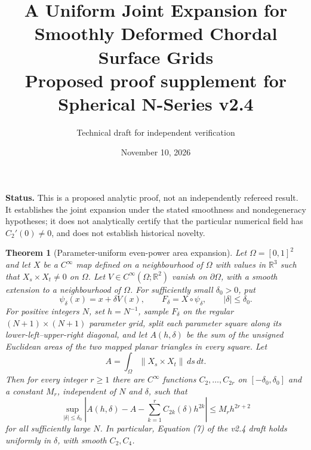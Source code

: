 \documentclass[11pt]{article}
\title{A Uniform Joint Expansion for Smoothly Deformed Chordal Surface Grids\\\large Proposed proof supplement for Spherical N-Series v2.4}
\author{Technical draft for independent verification}
\date{November 10, 2026}
\newtheorem{theorem}{Theorem}
\begin{document}
\maketitle
\noindent\textbf{Status.} This is a proposed analytic proof, not an independently refereed result. It establishes the joint expansion under the stated smoothness and nondegeneracy hypotheses; it does not analytically certify that the particular numerical field has $C_2'(0)\ne0$, and does not establish historical novelty.

\begin{theorem}[Parameter-uniform even-power area expansion]\label{thm:uniform}
Let $\Omega=[0,1]^2$ and let $X$ be a $C^\infty$ map defined on a neighbourhood of $\Omega$ with values in $\mathbb R^3$ such that $X_s\times X_t\ne0$ on $\Omega$. Let $V\in C^\infty(\Omega;\mathbb R^2)$ vanish on $\partial\Omega$, with a smooth extension to a neighbourhood of $\Omega$. For sufficiently small $\delta_0>0$, put
\[
\psi_\delta(x)=x+\delta V(x),\qquad F_\delta=X\circ\psi_\delta,\qquad |\delta|\le\delta_0.
\]
For positive integers $N$, set $h=N^{-1}$, sample $F_\delta$ on the regular $(N+1)\times(N+1)$ parameter grid, split each parameter square along its lower-left--upper-right diagonal, and let $A(h,\delta)$ be the sum of the unsigned Euclidean areas of the two mapped planar triangles in every square. Let
\[
A=\int_\Omega\|X_s\times X_t\|\,ds\,dt.
\]
Then for every integer $r\ge1$ there are $C^\infty$ functions $C_2,\ldots,C_{2r}$ on $[-\delta_0,\delta_0]$ and a constant $M_r$, independent of $N$ and $\delta$, such that
\[
\sup_{|\delta|\le\delta_0}\left|A(h,\delta)-A-\sum_{k=1}^{r}C_{2k}(\delta)h^{2k}\right|\le M_r h^{2r+2}
\]
for all sufficiently large $N$. In particular, Equation (7) of the v2.4 draft holds uniformly in $\delta$, with smooth $C_2,C_4$.
\end{theorem}
\end{document}
